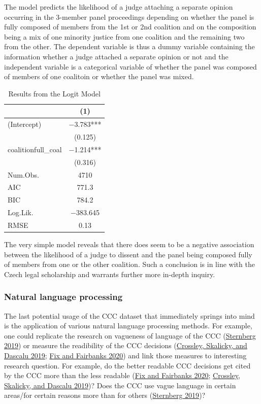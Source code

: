 \documentclass[
  11pt,
]{article}
\begin{document}
The model predicts the likelihood of a judge attaching a separate
opinion occurring in the 3-member panel proceedings depending on whether
the panel is fully composed of members from the 1st or 2nd coalition and
on the composition being a mix of one minority justice from one
coalition and the remaining two from the other. The dependent variable
is thus a dummy variable containing the information whether a judge
attached a separate opinion or not and the independent variable is a
categorical variable of whether the panel was composed of members of one
coalitoin or whether the panel was mixed.

\begin{table}
\centering
\caption{\label{tab:coalitions}Results from the Logit Model}
\centering
\begin{tabular}[t]{lc}
\toprule
  & (1)\\
\midrule
(Intercept) & \num{-3.783}***\\
 & (\num{0.125})\\
coalitionfull\_coal & \num{-1.214}***\\
 & (\num{0.316})\\
\midrule
Num.Obs. & \num{4710}\\
AIC & \num{771.3}\\
BIC & \num{784.2}\\
Log.Lik. & \num{-383.645}\\
RMSE & \num{0.13}\\
\bottomrule
\end{tabular}
\end{table}

The very simple model reveals that there does seem to be a negative
association between the likelihood of a judge to dissent and the panel
being composed fully of members from one or the other coalition. Such a
conclusion is in line with the Czech legal scholarship and warrants
further more in-depth inquiry.

\hypertarget{natural-language-processing}{%
\subsubsection{Natural language
processing}\label{natural-language-processing}}

The last potential usage of the CCC dataset that immediately springs
into mind is the application of various natural language processing
methods. For example, one could replicate the research on vagueness of
language of the CCC
(\protect\hyperlink{ref-sternbergNoPublicNo2019}{Sternberg 2019}) or
measure the readibility of the CCC decisions
(\protect\hyperlink{ref-crossleyMovingClassicReadability2019}{Crossley,
Skalicky, and Dascalu 2019};
\protect\hyperlink{ref-fixEffectOpinionReadability2020}{Fix and
Fairbanks 2020}) and link those measures to interesting research
question. For example, do the better readable CCC decisions get cited by
the CCC more than the less readable
(\protect\hyperlink{ref-fixEffectOpinionReadability2020}{Fix and
Fairbanks 2020};
\protect\hyperlink{ref-crossleyMovingClassicReadability2019}{Crossley,
Skalicky, and Dascalu 2019})? Does the CCC use vague language in certain
areas/for certain reasons more than for others
(\protect\hyperlink{ref-sternbergNoPublicNo2019}{Sternberg 2019})?
\end{document}
